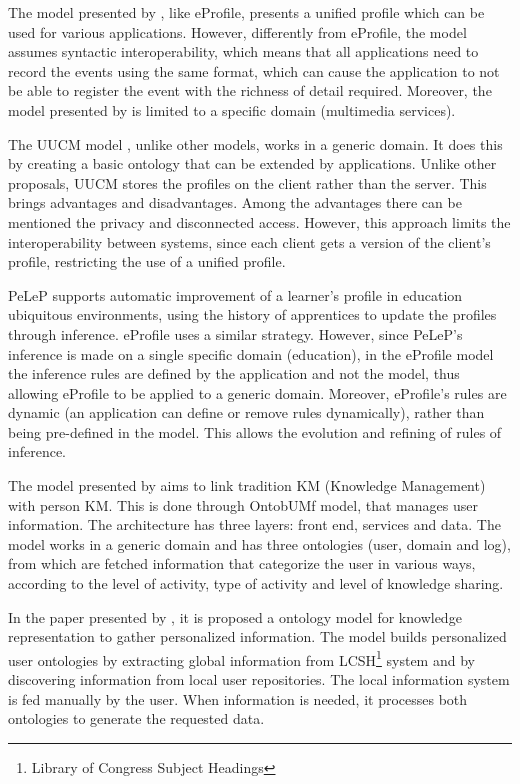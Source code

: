 \documentclass{svjour3}                     %
\begin{document}
The model presented by \citet{chellouche10}, like eProfile, presents a unified profile which can be used for various applications. However, differently from eProfile, the model assumes syntactic interoperability, which means that all applications need to record the events using the same format, which can cause the application to not be able to register the event with the richness of detail required. Moreover, the model presented by \citet{chellouche10} is limited to a specific domain (multimedia services).

The UUCM model \citep{niederee04}, unlike other models, works in a generic domain. It does this by creating a basic ontology that can be extended by applications. Unlike other proposals, UUCM stores the profiles on the client rather than the server. This brings advantages and disadvantages. Among the advantages there can be mentioned the privacy and disconnected access. However, this approach limits the interoperability between systems, since each client gets a version of the client's profile, restricting the use of a unified profile.

PeLeP \citep{pelep} supports automatic improvement of a learner's profile in education ubiquitous environments, using the history of apprentices to update the profiles through inference. eProfile uses a similar strategy. However, since PeLeP's inference is made on a single specific domain (education), in the eProfile model the inference rules are defined by the application and not the model, thus allowing eProfile to be applied to a generic domain. Moreover, eProfile's rules are dynamic (an application can define or remove rules dynamically), rather than being pre-defined in the model. This allows the evolution and refining of rules of inference.

The model presented by \citet{razmerita11} aims to link tradition KM (Knowledge Management) with person KM. This is done through OntobUMf model, that manages user information. The architecture has three layers: front end, services and data. The model works in a generic domain and has three ontologies (user, domain and log), from which are fetched information that categorize the user in various ways, according to the level of activity, type of activity and level of knowledge sharing.

In the paper presented by \citet{tao11}, it is proposed a ontology model for knowledge representation to gather personalized information. The model builds personalized user ontologies by extracting global information from LCSH\footnote{Library of Congress Subject Headings} system and by discovering information from local user repositories. The local information system is fed manually by the user. When information is needed, it processes both ontologies to generate the requested data.
\end{document}
